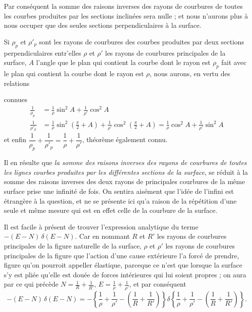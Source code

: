 \documentclass[11pt,a4paper]{article}
\begin{document}
Par conséquent la somme des raisons inverses des rayons de courbures de toutes
les courbes produites par les sections inclinées sera nulle ; et nous n'aurons
plus à nous occuper que des seules sections perpendiculaires à la surface.

Si $\rho_p$ et $\rho'_p$ sont les rayons de courbures des courbes produites
par deux sections perpendiculaires entr'elles $\rho$ et $\rho'$ les rayons de
courbures principales de la surface, $A$ l'angle que le plan qui contient la
courbe dont le rayon est $\rho_p$ fait avec le plan qui contient la courbe
dont le rayon est $\rho$, nous aurons, en vertu des relations

connues
\begin{align*}
  \frac{1}{\rho_p} &= \frac{1}{\rho}\sin^2 A + \frac{1}{\rho'}\cos^2 A \\
  \frac{1}{\rho'_p} &= \frac{1}{\rho}\sin^2\!\left(\frac{\pi}{2}+A\right)
     + \frac{1}{\rho'}\cos^2\!\left(\frac{\pi}{2}+A\right)
   = \frac{1}{\rho}\cos^2 A + \frac{1}{\rho'}\sin^2 A
\end{align*}
et enfin $\dfrac{1}{\rho_p} + \dfrac{1}{\rho'_p} = \dfrac{1}{\rho} +
\dfrac{1}{\rho'}$, théorème également connu.

Il en résulte que \emph{la somme des raisons inverses des rayons de courbures
de toutes les lignes courbes produites par les différentes sections de la
surface}, se réduit à la somme des raisons inverses des deux rayons de
principales courbures de la même surface prise une infinité de fois. On
sentira aisément que l'idée de l'infini est étrangère à la question, et ne se
présente ici qu'a raison de la répétition d'une seule et même mesure qui est
en effet celle de la courbure de la surface.

Il est facile à présent de trouver l'expression analytique du terme
$-(E-N)\,\delta(E-N)$. Car en nommant $R$ et $R'$ les rayons de courbures
principales de la figure naturelle de la surface, $\rho$ et $\rho'$ les rayons
de courbures principales de la figure que l'action d'une cause extérieure l'a
forcé de prendre, figure qu'on pourroit appeller élastique, parceque ce n'est
que lorsque la surface s'y est pliée qu'elle est douée de forces intérieures
qui lui soient propres ; on aura par ce qui précède
$N = \frac{1}{R} + \frac{1}{R'}$, $E = \frac{1}{\rho} + \frac{1}{\rho'}$, et
par conséquent
\[
  -(E-N)\,\delta(E-N) =
  -\left\{ \frac{1}{\rho} + \frac{1}{\rho'}
    - \left( \frac{1}{R} + \frac{1}{R'} \right) \right\}
  \delta\left\{ \frac{1}{\rho} + \frac{1}{\rho'}
    - \left( \frac{1}{R} + \frac{1}{R'} \right) \right\} .
\]
\end{document}
